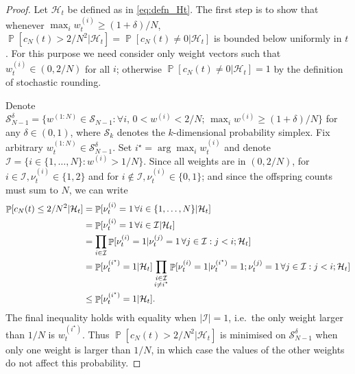 \documentclass{article} %
\theoremstyle{definition}
\DeclareMathOperator{\Prob}{\mathbb{P}}
\newcommand{\1}[1]{\mathbbm{1}_{\{#1\}}}
\begin{document}
\begin{proof}
Let $\mathcal{H}_t$ be defined as in \eqref{eq:defn_Ht}. The first step is to show that whenever $\max_i w_t^{(i)} \geq (1+\delta)/N$, $\Prob[  c_N(t) > 2/N^2 | \mathcal{H}_t ] = \Prob[ c_N(t) \neq 0 | \mathcal{H}_t ]$ is bounded below uniformly in $t$.
For this purpose we need consider only weight vectors such that $w_t^{(i)} \in (0,2/N)$ for all $i$; otherwise $\Prob[ c_N(t) \neq 0 | \mathcal{H}_t ] =1$ by the definition of stochastic rounding.

Denote $\mathcal{S}_{N-1}^\delta = \{ w^{(1:N)} \in \mathcal{S}_{N-1} :  \forall i, \, 0 <w^{(i)} <2/N ;\, \max_i w^{(i)} \geq (1 + \delta)/N \}$ for any $\delta \in (0, 1)$, where $\mathcal{S}_{k}$ denotes the $k$-dimensional probability simplex.
Fix arbitrary $w_t^{(1:N)} \in \mathcal{S}_{N-1}^\delta$. Set $i^\star = \arg\max_i w_t^{(i)}$ and denote $\mathcal{I} = \{i \in \{1,\dots,N\} : w^{(i)} > 1/N \}$.
Since all weights are in $(0, 2/N)$, for $i \in \mathcal{I}, \nu_t^{(i)} \in \{1,2\}$ and for $i \notin \mathcal{I}, \nu_t^{(i)} \in \{0,1\}$; and since the offspring counts must sum to $N$, we can write
\begin{align}\label{eq:smallcN_istar}
\Prob[ c_N(t) \leq 2/N^2 | \mathcal{H}_t ]
&= \Prob[ \nu_t^{(i)} =1 \,\forall i\in\{1,\dots,N\} | \mathcal{H}_t ] \notag\\
&= \Prob[ \nu_t^{(i)} =1 \,\forall i\in \mathcal{I} | \mathcal{H}_t ] \notag\\
&= \prod_{i \in \mathcal{I}} \Prob[ \nu_t^{(i)} =1 | \nu_t^{(j)}=1 \,\forall j \in \mathcal{I}: j<i; \mathcal{H}_t ] \notag\\
&= \Prob[ \nu_t^{(i^\star)} =1 | \mathcal{H}_t ] \prod_{\substack{i \in \mathcal{I} \\ i \neq i^\star}} \Prob[ \nu_t^{(i)} =1 | \nu_t^{(i^\star)}=1; \nu_t^{(j)}=1 \,\forall j \in \mathcal{I}: j<i ; \mathcal{H}_t ] \notag\\
&\leq \Prob[ \nu_t^{(i^\star)} =1 | \mathcal{H}_t ] .
\end{align}
The final inequality holds with equality when $|\mathcal{I}| =1$, i.e.\ the only weight larger than $1/N$ is $w_t^{(i^\star)}$.
Thus $\Prob[ c_N(t) > 2/N^2 | \mathcal{H}_t ]$ is minimised on $\mathcal{S}_{N-1}^\delta$ when only one weight is larger than $1/N$, in which case the values of the other weights do not affect this probability. 


\end{proof}
\end{document}
